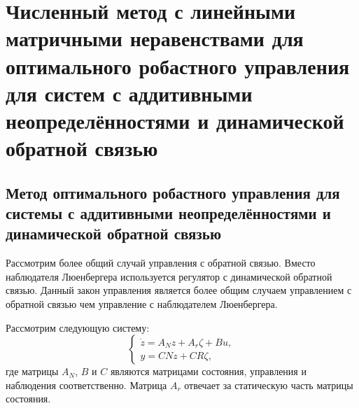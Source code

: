 \chapter{Численный метод с линейными матричными неравенствами для оптимального робастного управления для систем с аддитивными неопределённостями и динамической обратной связью}\label{ch:ch5}
\section{Метод оптимального робастного управления для системы с аддитивными неопределённостями и динамической обратной связью}\label{sec:ch5/sect1}
Рассмотрим более общий случай управления с обратной связью. Вместо наблюдателя Люенбергера используется регулятор с динамической обратной связью. Данный закон управления является более общим случаем управлением с обратной связью чем управление с наблюдателем Люенбергера.

Рассмотрим следующую систему:
\begin{equation}
	\label{eq:part5_linear_dynamics}
	\begin{cases}
		\dot z={A}_N {z} + {A}_r {\zeta} + {B} {u},\\
		y = {C} {N} {z} + {C} {R} {\zeta},
	\end{cases}
\end{equation}
где матрицы $A_N$,  $B$ и $C$ являются матрицами состояния, управления и наблюдения соответственно. Матрица ${A}_r$ отвечает за статическую часть матрицы состояния.

